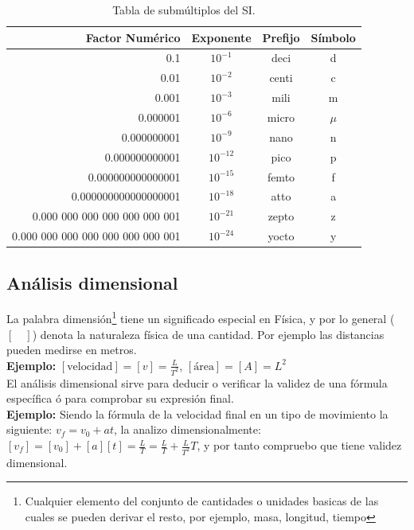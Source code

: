 \documentclass[a5paper,pagesize,10pt,bibtotoc,pointlessnumbers,
normalheadings,DIV=9,fleqn,x11names,table,twoside=false]{scrbook}
\begin{document}
\begin{table}[H]
 \begin{center}
\begin{tabular}{rccc}
\hline
Factor Numérico & Exponente & Prefijo & Símbolo\\
\hline
0.1 & $10^{-1}$ & deci & d\\
0.01 & $10^{-2}$ & centi & c\\
0.001 & $10^{-3}$ & mili & m\\
0.000001 & $10^{-6}$ & micro & $\mu$\\
0.000000001 & $10^{-9}$ & nano  & n\\
0.000000000001 & $10^{-12}$ & pico & p\\
0.000000000000001 & $10^{-15}$ & femto & f\\
0.000000000000000001 & $10^{-18}$  & atto & a\\
0.000 000 000 000 000 000 001 & $10^{-21}$ & zepto & z\\
0.000 000 000 000 000 000 000 001 & $10^{-24}$ & yocto & y\\
\hline
\end{tabular}
\caption{Tabla de submúltiplos del SI.}
 \end{center}
 \end{table}
 
\subsection{Análisis dimensional}

La palabra dimensión\footnote{Cualquier elemento del conjunto de cantidades o unidades basicas de las cuales se pueden derivar el 
resto, por ejemplo, masa, longitud, tiempo} tiene un significado especial en Física, y por lo general ($[\quad]$) denota la 
naturaleza física de una cantidad. Por ejemplo las distancias pueden medirse en metros.\\

\textbf{Ejemplo:} $[\text{velocidad}] = [v] =\frac{L}{T^2}$, $[\text{área}] = [A] = L^2$\\
 
El análisis dimensional sirve para deducir o verificar la validez de una fórmula específica ó para comprobar su expresión final.\\

\textbf{Ejemplo:} Siendo la fórmula de la velocidad final en un tipo de movimiento la siguiente: $v_f = v_0 + at$, la analizo 
dimensionalmente: $[v_f] = [v_0] + [a][t] = \frac{L}{T} = \frac{L}{T} + \frac{L}{T^2}T$, y por tanto compruebo que tiene validez 
dimensional.
\end{document}
